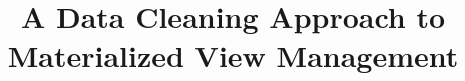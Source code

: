 \documentclass{sig-alternate}
\begin{document}
\newtheorem{theorem}{Theorem}
\newtheorem{example}{Example}
\newtheorem{definition}{Definition}
\newtheorem{proposition}{Proposition}
\newtheorem{lemma}{Lemma}
\newtheorem{corollary}{Corollary}

\newcommand{\cond}{\textrm{Cond}\xspace}
\newcommand{\dataset}{data set\xspace}
\newcommand{\datasets}{data sets\xspace}
\newcommand{\spview}{\textsf{SPView}\xspace}
\newcommand{\fjview}{\textsf{FJView}\xspace}
\newcommand{\aggview}{\textsf{AggView}\xspace}
\newcommand{\hashfunc}[1]{\textsf{hashfunc}(#1)\xspace}

\newcommand{\avgfunc}{\ensuremath{\texttt{avg} }\xspace}
\newcommand{\countfunc}{\ensuremath{\texttt{count}}\xspace}
\newcommand{\sumfunc}{\ensuremath{\texttt{sum} }\xspace}
\newcommand{\ratio}{\ensuremath{\rho }\xspace}


\newcommand{\tbl}[1]{\textsf{#1}\xspace}
\newcommand{\field}[1]{\textsf{#1}\xspace}
\newcommand{\cost}{\textrm{cost}\xspace}
\newcommand{\ans}{\textsf{ans}\xspace}
\newcommand{\dans}{\Delta\textsf{ans}\xspace}
\newcommand{\cqp}{correcting query processing\xspace}
\newcommand{\Cqp}{Correcting query processing\xspace}

\newcommand{\reminder}[1]{{{\textcolor{magenta}{\{\{\bf #1\}\}}}\xspace}}
\newcommand{\specialcell}[2][c]{%
  \begin{tabular}[#1]{@{}c@{}}#2\end{tabular}}

\pagestyle{plain}

\title{A Data Cleaning Approach to Materialized View Management}
\end{document}
